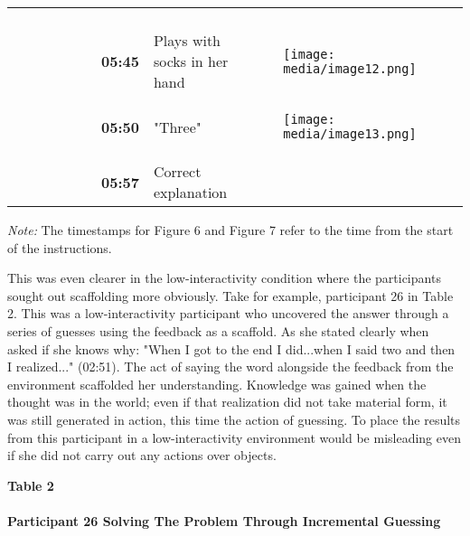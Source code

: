 \documentclass{article}
\begin{document}
\begin{table}
\begin{tabular}{l  l  l  l}
\begin{figure}
\end{figure}
\\
 & \textbf{05:45} & Plays with socks in her hand & 
\begin{figure}

  \texttt{[image: media/image12.png]}
\caption{}
\label{}


\end{figure}
\\
 & \textbf{05:50} & "Three" & 
\begin{figure}

  \texttt{[image: media/image13.png]}
\caption{}
\label{}


\end{figure}
\\
 & \textbf{05:57} & Correct explanation & \\


\end{tabular}


\end{table}
\emph{Note:} The timestamps for Figure 6 and Figure 7 refer to the time from the start of the instructions.

This was even clearer in the low-interactivity condition where the participants sought out scaffolding more obviously. Take for example, participant 26 in Table 2. This was a low-interactivity participant who uncovered the answer through a series of guesses using the feedback as a scaffold. As she stated clearly when asked if she knows why: "When I got to the end I did...when I said two and then I realized..." (02:51). The act of saying the word alongside the feedback from the environment scaffolded her understanding. Knowledge was gained when the thought was in the world; even if that realization did not take material form, it was still generated in action, this time the action of guessing. To place the results from this participant in a low-interactivity environment would be misleading even if she did not carry out any actions over objects. 



\textbf{Table 2}

\paragraph{Participant 26 Solving The Problem Through Incremental Guessing }
\end{document}
